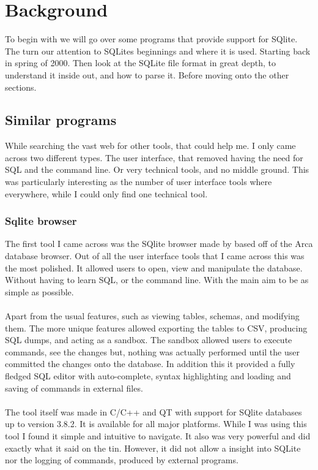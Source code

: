 \section{Background}
\label{sec:sqlite_intro}

To begin with we will go over some programs that provide support for SQlite. The turn our attention to SQLites beginnings and where it is used. Starting back in spring of 2000. Then look at the SQLite file format in great depth, to understand it inside out, and how to parse it. Before moving onto the other sections.

\subsection{Similar programs}
\label{subsec:similar_programs}

While searching the vast web for other tools, that could help me. I only came across two different types. The user interface, that removed having the need for SQL and the command line. Or very technical tools, and no middle ground. This was particularly interesting as the number of user interface tools where everywhere, while I could only find one technical tool. 

\subsubsection{Sqlite browser}
\label{subsubsec:sqlite_browser}

The first tool I came across was the SQlite browser made by \cite{sqlitebrowser} based off of the Arca database browser. Out of all the user interface tools that I came across this was the most polished. It allowed users to open, view and manipulate the database. Without having to learn SQL, or the command line. With the main aim to be as simple as possible. 
\\\\
Apart from the usual features, such as viewing tables, schemas, and modifying them. The more unique features allowed exporting the tables to CSV, producing SQL dumps, and acting as a sandbox. The sandbox allowed users to execute commands, see the changes but, nothing was actually performed until the user committed the changes onto the database. In addition this it provided a fully fledged SQL editor with auto-complete, syntax highlighting and loading and saving of commands in external files.
\\\\
The tool itself was made in C/C++ and QT with support for SQlite databases up to version 3.8.2. It is available for all major platforms. While I was using this tool I found it simple and intuitive to navigate. It also was very powerful and did exactly what it said on the tin. However, it did not allow a insight into SQLite nor the logging of commands, produced by external programs.

